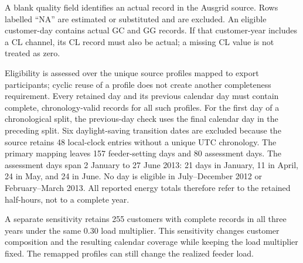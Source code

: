 \documentclass[11pt]{article}
\begin{document}
A blank quality field identifies an actual record in the Ausgrid source. Rows
labelled ``NA'' are estimated or substituted and are excluded. An eligible
customer-day contains actual GC and GG records. If that customer-year includes a
CL channel, its CL record must also be actual; a missing CL value is not treated
as zero.

Eligibility is assessed over the unique source profiles mapped to export
participants; cyclic reuse of a profile does not create another completeness
requirement. Every retained day and its previous calendar day must contain
complete, chronology-valid records for all such profiles. For the first day of a
chronological split, the previous-day check uses the final calendar day in the
preceding split. Six daylight-saving transition dates are excluded because
the source retains 48 local-clock entries without a unique UTC chronology. The
primary mapping leaves 157 feeder-setting days and 80 assessment days. The
assessment days span 2 January to 27 June 2013: 21 days in January, 11 in April,
24 in May, and 24 in June. No day is eligible in July--December 2012 or
February--March 2013. All reported energy totals therefore refer to the retained
half-hours, not to a complete year.

A separate sensitivity retains 255 customers with complete records in all three
years under the same 0.30 load multiplier. This sensitivity changes customer
composition and the resulting calendar coverage while keeping the load
multiplier fixed. The remapped profiles can still change the realized feeder
load.
\end{document}
